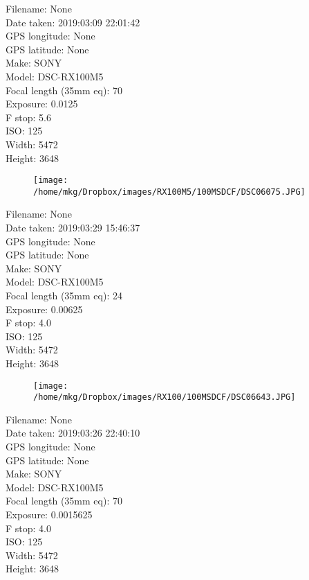\clearpage
\recalctypearea
\newpage
\noindent
Filename: None\\ 
Date taken: 2019:03:09 22:01:42\\ 
GPS longitude: None\\ 
GPS latitude: None\\ 
Make: SONY\\ 
Model: DSC-RX100M5\\ 
Focal length (35mm eq): 70\\ 
Exposure: 0.0125\\ 
F stop: 5.6\\ 
ISO: 125\\ 
Width: 5472\\ 
Height: 3648\\ 

\clearpage
\recalctypearea
\newpage
\noindent
\begin{figure}
    \texttt{[image: /home/mkg/Dropbox/images/RX100M5/100MSDCF/DSC06075.JPG]}
    \captionlistentry[figure]{\url{\protect\detokenize{}}}
\end{figure}

\clearpage
\recalctypearea
\newpage
\noindent
Filename: None\\ 
Date taken: 2019:03:29 15:46:37\\ 
GPS longitude: None\\ 
GPS latitude: None\\ 
Make: SONY\\ 
Model: DSC-RX100M5\\ 
Focal length (35mm eq): 24\\ 
Exposure: 0.00625\\ 
F stop: 4.0\\ 
ISO: 125\\ 
Width: 5472\\ 
Height: 3648\\ 

\clearpage
\recalctypearea
\newpage
\noindent
\begin{figure}
    \texttt{[image: /home/mkg/Dropbox/images/RX100/100MSDCF/DSC06643.JPG]}
    \captionlistentry[figure]{\url{\protect\detokenize{}}}
\end{figure}

\clearpage
\recalctypearea
\newpage
\noindent
Filename: None\\ 
Date taken: 2019:03:26 22:40:10\\ 
GPS longitude: None\\ 
GPS latitude: None\\ 
Make: SONY\\ 
Model: DSC-RX100M5\\ 
Focal length (35mm eq): 70\\ 
Exposure: 0.0015625\\ 
F stop: 4.0\\ 
ISO: 125\\ 
Width: 5472\\ 
Height: 3648\\ 

